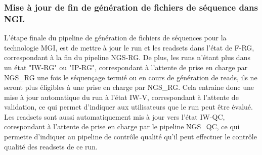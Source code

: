 \subsubsection*{Mise à jour de fin de génération de fichiers de séquence dans NGL}
L'étape finale du pipeline de génération de fichiers de séquences pour la technologie MGI, est de mettre à jour le run et les readsets dans l'état de \og F-RG\fg{}, correspondant à la fin du pipeline NGS-RG.
De plus, les runs n'étant plus dans un état "IW-RG" ou "IP-RG", correspondant à l'attente de prise en charge par NGS\_RG une fois le séquençage termié ou en cours de génération de reads, ils ne seront plus éligibles à une prise en charge par NGS\_RG.
Cela entraine donc une mise à jour automatique du run à l'état \og IW-V\fg{}, correspondant à l'attente de validation, ce qui permet d'indiquer aux utilisateurs que le run peut être évalué.
Les readsets sont aussi automatiquement mis à jour vers l'état \og IW-QC\fg{}, corespondant à l'attente de prise en charge par le pipeline NGS\_QC, ce qui permette d'indiquer au pipeline de contrôle qualité qu'il peut effectuer le contrôle qualité des readsets de ce run.

